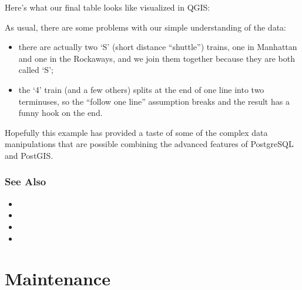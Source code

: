 \documentclass[a4paper,11pt,english]{sphinxmanual}
\begin{document}
\begin{sphinxVerbatim}[commandchars=\\\{\}]
      
\end{sphinxVerbatim}

Here’s what our final table looks like visualized in QGIS:

\noindent{}

As usual, there are some problems with our simple understanding of the data:
\begin{itemize}
\item {} 
there are actually two ‘S’ (short distance “shuttle”) trains, one in Manhattan and one in the Rockaways, and we join them together because they are both called ‘S’;

\item {} 
the ‘4’ train (and a few others) splits at the end of one line into two terminuses, so the “follow one line” assumption breaks and the result has a funny hook on the end.

\end{itemize}

Hopefully this example has provided a taste of some of the complex data manipulations that are possible combining the advanced features of PostgreSQL and PostGIS.


\subsection{See Also}
\label{\detokenize{advanced:id12}}\begin{itemize}
\item {} 

\item {} 

\item {} 

\item {} 

\end{itemize}


\chapter{Maintenance}
\label{\detokenize{maintenance:maintenance}}\label{\detokenize{maintenance::doc}}
\end{document}
